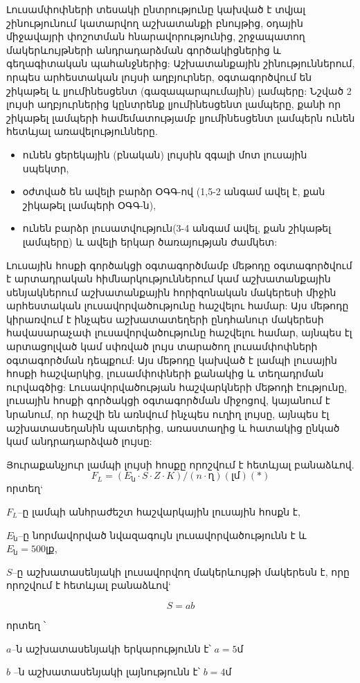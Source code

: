 \documentclass[12pt]{article}
\begin{document}
\begin{sloppypar}
Լուսամփոփների տեսակի ընտրությունը կախված է տվյալ շինությունում կատարվող աշխատանքի բնույթից, օդային միջավայրի փոշոտման հնարավորությունից, շրջապատող մակերևույթների անդրադարձման գործակիցներից և գեղագիտական պահանջներից: Աշխատանքային շինություններում, որպես արհեստական լույսի աղբյուրներ, օգտագործվում են շիկաթել և լյումինեսցենտ (գազապարպումային) լամպերը: Նշված 2 լույսի աղբյուրներից կընտրենք լյումինեսցենտ լամպերը, քանի որ շիկաթել լամպերի համեմատությամբ լյումինեսցենտ լամպերն ունեն հետևյալ առավելությունները. 

\begin{itemize}
\item ունեն ցերեկային (բնական) լույսին զգալի մոտ լուսային սպեկտր,
\item օժտված են ավելի բարձր ՕԳԳ-ով (1,5-2 անգամ ավել է, քան շիկաթել լամպերի ՕԳԳ-ն),
\item ունեն բարձր լուսատվություն(3-4 անգամ ավել, քան շիկաթել լամպերը) և ավելի երկար ծառայության ժամկետ:
\end{itemize}

	Լուսային հոսքի գործակցի օգտագործմամբ մեթոդը օգտագործվում է արտադրական հիմնարկություններում կամ աշխատանքային սենյակներում աշխատանքային հորիզոնական մակերեսի միջին արհեստական լուսավորվածությունը հաշվելու համար: Այս մեթոդը կիրառվում է ինչպես աշխատատեղերի ընդհանուր մակերեսի հավասարաչափ լուսավորվածությունը հաշվելու համար, այնպես էլ արտացոլված կամ սփռված լույս տարածող լուսամփոփների օգտագործման դեպքում: Այս մեթոդը կախված է լամպի լուսային հոսքի հաշվարկից, լուսամփոփների քանակից և տեղադրման ուրվագծից: Լուսավորվածության հաշվարկների մեթոդի էությունը, լուսային հոսքի գործակցի օգտագործման միջոցով, կայանում է նրանում, որ հաշվի են առնվում ինչպես ուղիղ լույսը, այնպես էլ աշխատասեղանին պատերից, առաստաղից և հատակից ընկած կամ անդրադարձված լույսը: 

Յուրաքանչյուր լամպի լույսի հոսքը որոշվում է հետևյալ բանաձևով.
$$F_L = ( E_ն \cdot S \cdot Z \cdot K ) / (n \cdot ղ )   (լմ)  (*)$$
որտեղ`

$F_L$–ը լամպի անհրաժեշտ հաշվարկային լուսային հոսքն է, 

$E_ն$–ը նորմավորված նվազագույն լուսավորվածությունն է և $E_ն = 500 լք$,

$S$–ը  աշխատասենյակի լուսավորվող մակերևույթի մակերեսն է, որը որոշվում է հետևյալ բանաձևով`            

$$S = ab$$

որտեղ ՝

$a$–ն աշխատասենյակի երկարությունն է՝  $a = 5 մ$

$b$ –ն աշխատասենյակի լայնությունն է՝  $b = 4 մ$


\end{sloppypar}
\end{document}
